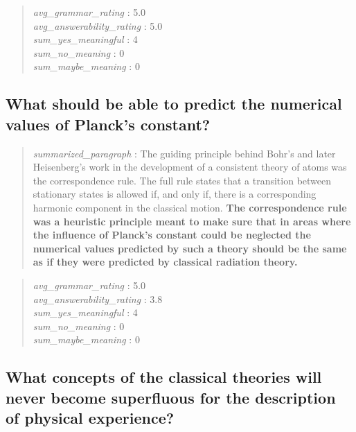 \begin{quote}
\emph{avg\_grammar\_rating} : 5.0\\
\emph{avg\_answerability\_rating} : 5.0\\
\emph{sum\_yes\_meaningful} : 4\\
\emph{sum\_no\_meaning} : 0\\
\emph{sum\_maybe\_meaning} : 0
\end{quote}

\hypertarget{what-should-be-able-to-predict-the-numerical-values-of-plancks-constant}{%
\subsection{What should be able to predict the numerical values of
Planck's
constant?}\label{what-should-be-able-to-predict-the-numerical-values-of-plancks-constant}}

\begin{quote}
\emph{summarized\_paragraph} : The guiding principle behind Bohr's and
later Heisenberg's work in the development of a consistent theory of
atoms was the correspondence rule. The full rule states that a
transition between stationary states is allowed if, and only if, there
is a corresponding harmonic component in the classical motion.
\textbf{The correspondence rule was a heuristic principle meant to make
sure that in areas where the influence of Planck's constant could be
neglected the numerical values predicted by such a theory should be the
same as if they were predicted by classical radiation theory.}
\end{quote}

\begin{quote}
\emph{avg\_grammar\_rating} : 5.0\\
\emph{avg\_answerability\_rating} : 3.8\\
\emph{sum\_yes\_meaningful} : 4\\
\emph{sum\_no\_meaning} : 0\\
\emph{sum\_maybe\_meaning} : 0
\end{quote}

\hypertarget{what-concepts-of-the-classical-theories-will-never-become-superfluous-for-the-description-of-physical-experience}{%
\subsection{What concepts of the classical theories will never become
superfluous for the description of physical
experience?}\label{what-concepts-of-the-classical-theories-will-never-become-superfluous-for-the-description-of-physical-experience}}

